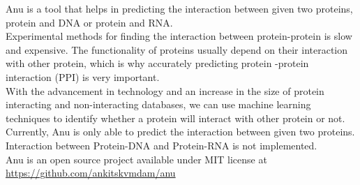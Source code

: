 \documentclass[../main.tex]{subfiles}
\begin{document}
Anu is a tool that helps in predicting the interaction between given
two proteins, protein and DNA or protein and RNA. \\
Experimental methods for finding the interaction between protein-protein
is slow and expensive. The functionality of proteins usually depend on their
interaction with other protein, which is why accurately predicting protein
-protein interaction (PPI) is very important. \\
With the advancement in technology and an increase in the size of protein
interacting and non-interacting databases, we can use machine learning
techniques to identify whether a protein will interact with other protein
or not. \\
Currently, Anu is only able to predict the interaction between given
two proteins. Interaction between Protein-DNA and Protein-RNA is not
implemented. \\
Anu is an open source project available under MIT license at \\
\href{https://github.com/ankitskvmdam/anu}{https://github.com/ankitskvmdam/anu}
\end{document}
